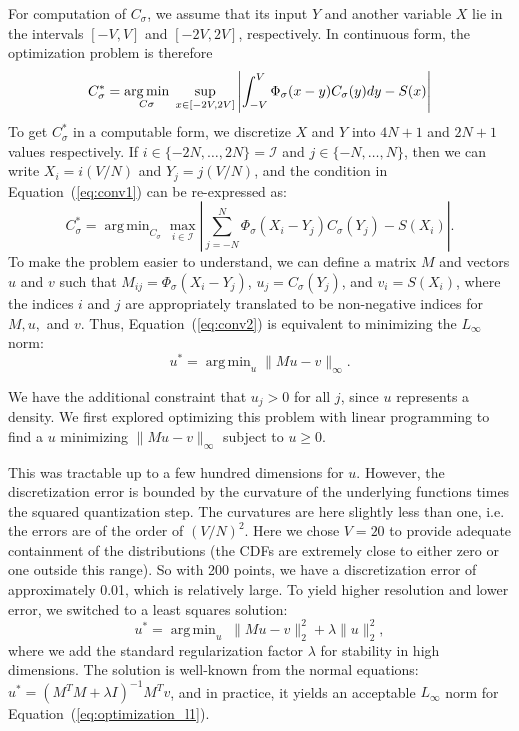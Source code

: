 \documentclass[twoside]{article} \usepackage{aistats2017}
\DeclareMathOperator*{\argmin}{arg\,min}
\begin{document}
For computation of $C_\sigma$, we assume that its input $Y$ and
another variable $X$ lie in the intervals $[-V,V]$ and $[-2V,2V]$, respectively.
In continuous form, the optimization problem is therefore
\begin{equation}\label{eq:conv1}
    \small{C_\sigma^* = \argmin_{C\sigma} \; \sup_{x \in [-2V,2V]}\left|\int_{-V}^{V}\Phi_{\sigma}(x-y) C_{\sigma}(y)dy - S(x)\right|}
\end{equation}
To get $C_\sigma^*$ in a computable form, we discretize $X$ and $Y$ into $4N+1$
and $2N+1$ values respectively. If $i \in \{-2N, \ldots, 2N\}=\mathcal{I}$ and
$j \in \{-N, \ldots, N\}$, then we can write $X_i = i(V/N)$ and $Y_j = j(V/N)$,
and the condition in Equation~(\ref{eq:conv1}) can be re-expressed as:
\begin{equation}\label{eq:conv2}
    C_\sigma^* = \argmin_{C_\sigma} \max_{i \in \mathcal{I}}\left|\sum_{j = -N}^{N}\Phi_{\sigma}(X_i-Y_j) C_{\sigma}(Y_j) - S(X_i)\right|.
\end{equation}
To make the problem easier to understand, we can define a matrix $M$ and vectors
$u$ and $v$ such that $M_{ij} = \Phi_{\sigma}(X_i-Y_j)$, $u_j =
C_{\sigma}(Y_j)$, and $v_i = S(X_i)$, where the indices $i$ and $j$ are
appropriately translated to be non-negative indices for $M, u,$ and $v$. Thus,
Equation~(\ref{eq:conv2}) is equivalent to minimizing the $L_{\infty}$ norm:
\begin{equation}\label{eq:optimization_l1}
    u^* = \argmin_{u} \|Mu-v\|_{\infty}.
\end{equation}

We have the additional constraint that $u_j > 0$ for all $j$, since $u$
represents a density. We first explored optimizing this problem with linear
programming to find a $u$ minimizing $\|Mu - v\|_\infty$ subject to $u \ge 0$.

This was tractable up to a few hundred dimensions for $u$.  However, the
discretization error is bounded by the curvature of the underlying functions
times the squared quantization step. The curvatures are here slightly less than
one, i.e.  the errors are of the order of $(V/N)^2$.  Here we chose $V=20$ to
provide adequate containment of the distributions (the CDFs are extremely close
to either zero or one outside this range). So with 200 points, we have a
discretization error of approximately 0.01, which is relatively large.  To yield
higher resolution and lower error, we switched to a least squares solution:
\begin{equation}\label{eq:optimization_l2}
    u^* = \argmin_u\; \|Mu-v\|_2^2 + \lambda \|u\|_2^2,
\end{equation}
where we add the standard regularization factor $\lambda$ for stability in high
dimensions. The solution is well-known from the normal equations: $u^* = (M^TM +
\lambda I)^{-1}M^Tv$, and in practice, it yields an acceptable $L_{\infty}$ norm for
Equation~(\ref{eq:optimization_l1}).
\end{document}
